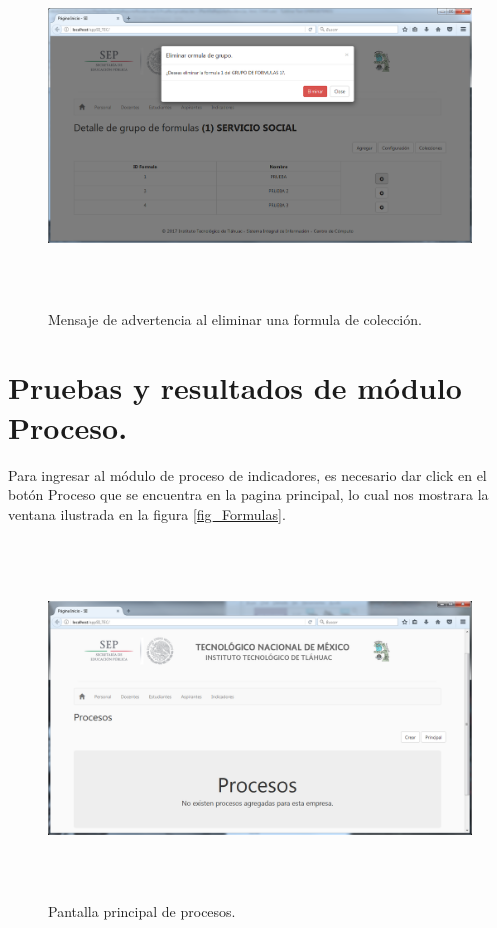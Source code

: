 				\begin{figure}[]
			        \centering
			        \includegraphics[width=16cm, height=9.5cm]{figuras/ColeccionesDetalleEliminar}
			        \caption{Mensaje de advertencia al eliminar una formula de colecci\'on.}
			        \label{fig_ColeccionesDetalleEliminar}
			    \end{figure}














		\section{Pruebas y resultados de m\'odulo Proceso.}
			   

			Para ingresar al m\'odulo de proceso de indicadores, es necesario dar click en el bot\'on Proceso que se encuentra en la pagina principal, lo cual nos mostrara la ventana ilustrada en la figura \ref{fig_Formulas}.


			\begin{figure}[H]
		        \centering
		        \includegraphics[width=16cm, height=9.5cm]{figuras/Procesos}
		        \caption{Pantalla principal de procesos.}
		        \label{fig_Procesos}
		    \end{figure}
			
